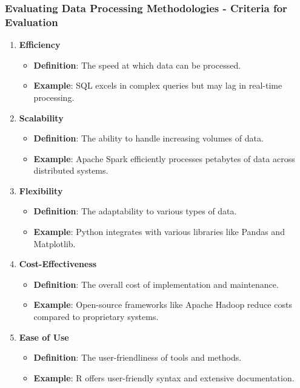 \documentclass[aspectratio=169]{beamer}
\begin{document}
\begin{frame}[fragile]
    \frametitle{Evaluating Data Processing Methodologies - Criteria for Evaluation}
    \begin{enumerate}
        \item \textbf{Efficiency}
        \begin{itemize}
            \item \textbf{Definition}: The speed at which data can be processed.
            \item \textbf{Example}: SQL excels in complex queries but may lag in real-time processing.
        \end{itemize}
        
        \item \textbf{Scalability}
        \begin{itemize}
            \item \textbf{Definition}: The ability to handle increasing volumes of data.
            \item \textbf{Example}: Apache Spark efficiently processes petabytes of data across distributed systems.
        \end{itemize}
        
        \item \textbf{Flexibility}
        \begin{itemize}
            \item \textbf{Definition}: The adaptability to various types of data.
            \item \textbf{Example}: Python integrates with various libraries like Pandas and Matplotlib.
        \end{itemize}
        
        \item \textbf{Cost-Effectiveness}
        \begin{itemize}
            \item \textbf{Definition}: The overall cost of implementation and maintenance.
            \item \textbf{Example}: Open-source frameworks like Apache Hadoop reduce costs compared to proprietary systems.
        \end{itemize}
        
        \item \textbf{Ease of Use}
        \begin{itemize}
            \item \textbf{Definition}: The user-friendliness of tools and methods.
            \item \textbf{Example}: R offers user-friendly syntax and extensive documentation.
        \end{itemize}
    \end{enumerate}
\end{frame}
\end{document}
